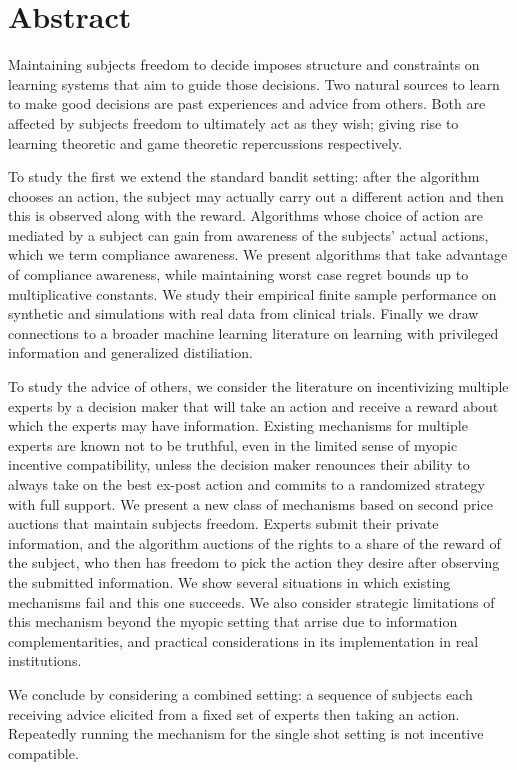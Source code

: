 \chapter*{Abstract}
\vspace{-1em}


Maintaining subjects freedom to decide imposes structure and constraints on learning systems that aim to guide those decisions. Two natural sources to learn to make good decisions are past experiences and advice from others. Both are affected by subjects freedom to ultimately act as they wish; giving rise to learning theoretic and game theoretic repercussions respectively.

To study the first we extend the standard bandit setting: after the algorithm chooses an action, the subject may actually carry out a different action and then this is observed along with the reward. Algorithms whose choice of action are mediated by a subject can gain from awareness of the subjects' actual actions, which we term compliance awareness. We present algorithms that take advantage of compliance awareness, while maintaining worst case regret bounds up to multiplicative constants.  We study their empirical finite sample performance on synthetic and simulations with real data from clinical trials. Finally we draw connections to a broader machine learning literature on learning with privileged information and generalized distiliation.  

To study the advice of others, we consider the literature on incentivizing multiple experts by a decision maker that will take an action and receive a reward about which the experts may have information. Existing mechanisms for multiple experts are known not to be truthful, even in the limited sense of myopic incentive compatibility, unless the decision maker renounces their ability to always take on the best ex-post action and commits to a randomized strategy with full support. We present a new class of mechanisms based on second price auctions that maintain subjects freedom. Experts submit their private information, and the algorithm auctions of the rights to a share of the reward of the subject, who then has freedom to pick the action they desire after observing the submitted information. We show several situations in which existing mechanisms fail and this one succeeds. We also consider strategic limitations of this mechanism beyond the myopic setting that arrise due to information complementarities, and practical considerations in its implementation in real institutions.


We conclude by considering a combined setting: a sequence of subjects each receiving advice elicited from a fixed set of experts then taking an action. Repeatedly running the mechanism for the single shot setting is not incentive compatible. 

